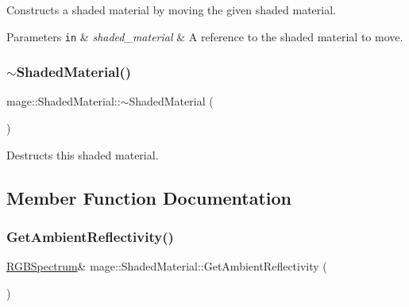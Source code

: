 Constructs a shaded material by moving the given shaded material.


\begin{DoxyParams}[1]{Parameters}
\mbox{\tt in}  & {\em shaded\+\_\+material} & A reference to the shaded material to move. \\
\hline
\end{DoxyParams}
\hypertarget{structmage_1_1_shaded_material_ac7be54322faed90a07b26225e270e571}{}\label{structmage_1_1_shaded_material_ac7be54322faed90a07b26225e270e571} 
\subsubsection{\texorpdfstring{$\sim$\+Shaded\+Material()}{~ShadedMaterial()}}
{\footnotesize\ttfamily mage\+::\+Shaded\+Material\+::$\sim$\+Shaded\+Material (\begin{DoxyParamCaption}{ }\end{DoxyParamCaption})\hspace{0.3cm}{\ttfamily [default]}}

Destructs this shaded material. 

\subsection{Member Function Documentation}
\hypertarget{structmage_1_1_shaded_material_afb2818be33977199ecb93689a76e5622}{}\label{structmage_1_1_shaded_material_afb2818be33977199ecb93689a76e5622} 
\subsubsection{\texorpdfstring{Get\+Ambient\+Reflectivity()}{GetAmbientReflectivity()}\hspace{0.1cm}{\footnotesize\ttfamily [1/2]}}
{\footnotesize\ttfamily \hyperlink{structmage_1_1_r_g_b_spectrum}{R\+G\+B\+Spectrum}\& mage\+::\+Shaded\+Material\+::\+Get\+Ambient\+Reflectivity (\begin{DoxyParamCaption}{ }\end{DoxyParamCaption})\hspace{0.3cm}{\ttfamily [noexcept]}}

